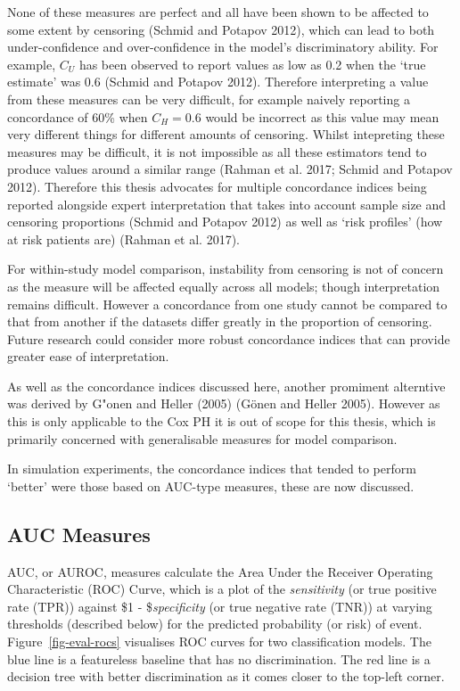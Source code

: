 \documentclass[
  letterpaper,
]{scrbook}
\theoremstyle{plain}
\theoremstyle{definition}
\theoremstyle{remark}
\begin{document}
None of these measures are perfect and all have been shown to be
affected to some extent by censoring (Schmid and Potapov 2012), which
can lead to both under-confidence and over-confidence in the model's
discriminatory ability. For example, \(C_U\) has been observed to report
values as low as 0.2 when the `true estimate' was 0.6 (Schmid and
Potapov 2012). Therefore interpreting a value from these measures can be
very difficult, for example naively reporting a concordance of 60\% when
\(C_H = 0.6\) would be incorrect as this value may mean very different
things for different amounts of censoring. Whilst intepreting these
measures may be difficult, it is not impossible as all these estimators
tend to produce values around a similar range (Rahman et al. 2017;
Schmid and Potapov 2012). Therefore this thesis advocates for multiple
concordance indices being reported alongside expert interpretation that
takes into account sample size and censoring proportions (Schmid and
Potapov 2012) as well as `risk profiles' (how at risk patients are)
(Rahman et al. 2017).

For within-study model comparison, instability from censoring is not of
concern as the measure will be affected equally across all models;
though interpretation remains difficult. However a concordance from one
study cannot be compared to that from another if the datasets differ
greatly in the proportion of censoring. Future research could consider
more robust concordance indices that can provide greater ease of
interpretation.

As well as the concordance indices discussed here, another promiment
alterntive was derived by G"onen and Heller (2005) (Gönen and Heller
2005). However as this is only applicable to the Cox PH it is out of
scope for this thesis, which is primarily concerned with generalisable
measures for model comparison.

In simulation experiments, the concordance indices that tended to
perform `better' were those based on AUC-type measures, these are now
discussed.

\hypertarget{sec-eval-crank-disc-auc}{%
\subsection{AUC Measures}\label{sec-eval-crank-disc-auc}}

AUC, or AUROC, measures calculate the Area Under the Receiver Operating
Characteristic (ROC) Curve, which is a plot of the \emph{sensitivity}
(or true positive rate (TPR)) against \$1 - \$\emph{specificity} (or
true negative rate (TNR)) at varying thresholds (described below) for
the predicted probability (or risk) of event. Figure~\ref{fig-eval-rocs}
visualises ROC curves for two classification models. The blue line is a
featureless baseline that has no discrimination. The red line is a
decision tree with better discrimination as it comes closer to the
top-left corner.
\end{document}
